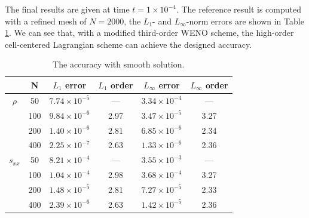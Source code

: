 \documentclass[review]{elsarticle}
\begin{document}
The final results are given at time $t = 1 \times 10^{-4}$. The reference  result is computed with a refined mesh of $N = 2000$, the  $L_1 $- and $ L_\infty$-norm  errors  are shown in Table \ref{tab:1}. We can see that,  with a  modified third-order WENO scheme, the high-order cell-centered Lagrangian scheme can  achieve the designed  accuracy.

\begin{table}[htbp]
  \small
  \centering
\setlength{\belowcaptionskip}{10pt}
\caption{\small The accuracy with smooth solution.}
  \begin{tabular}{cccccc}
\hline
            & N       & $L_1$ error  & $L_1$ order & $L_{\infty}$ error & $L_{\infty}$ order \\
\hline
    $ \rho $      &50           &  $7.74\times 10^{-5}$     &---         &  $3.34\times 10^{-4}$         & ---  \\
                  &100          &  $9.84\times 10^{-6}$     &2.97        &  $3.47\times 10^{-5}$         & 3.27 \\
                  &200          &  $1.40\times 10^{-6}$     &2.81        &  $6.85\times 10^{-6}$         & 2.34 \\
                  &400          &  $2.25\times 10^{-7}$     &2.63        &  $1.33\times 10^{-6}$         & 2.36 \\
\hline
    $s_{xx}$     &50           &  $8.21\times 10^{-4}$     &---         &  $3.55\times 10^{-3}$         & ---  \\
                  &100          &  $1.04\times 10^{-4}$     &2.98        &  $3.68\times 10^{-4}$         & 3.27 \\
                  &200          &  $1.48\times 10^{-5}$     &2.81        &  $7.27\times 10^{-5}$         & 2.33 \\
                  &400          &  $2.39\times 10^{-6}$     &2.63        &  $1.42\times 10^{-5}$         & 2.36 \\
\hline
    \end{tabular}
\label{tab:1}
\end{table}
\end{document}
